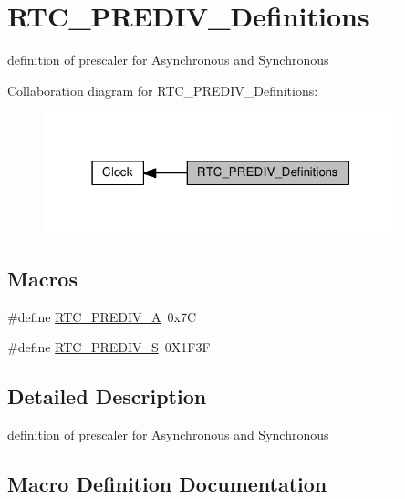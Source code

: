\hypertarget{group___r_t_c___p_r_e_d_i_v___definitions}{}\section{R\+T\+C\+\_\+\+P\+R\+E\+D\+I\+V\+\_\+\+Definitions}
\label{group___r_t_c___p_r_e_d_i_v___definitions}


definition of prescaler for Asynchronous and Synchronous  


Collaboration diagram for R\+T\+C\+\_\+\+P\+R\+E\+D\+I\+V\+\_\+\+Definitions\+:\nopagebreak
\begin{figure}[H]
\begin{center}
\leavevmode
\includegraphics[width=291pt]{d0/dbf/group___r_t_c___p_r_e_d_i_v___definitions}
\end{center}
\end{figure}
\subsection*{Macros}
\begin{DoxyCompactItemize}
\item 
\#define \hyperlink{group___r_t_c___p_r_e_d_i_v___definitions_ga7d28a18fc36cff684ad43ffd31ca45fc}{R\+T\+C\+\_\+\+P\+R\+E\+D\+I\+V\+\_\+A}~0x7C
\item 
\#define \hyperlink{group___r_t_c___p_r_e_d_i_v___definitions_ga3578b56bdfe76014a3af7e276fe6a6e4}{R\+T\+C\+\_\+\+P\+R\+E\+D\+I\+V\+\_\+S}~0\+X1\+F3F
\end{DoxyCompactItemize}


\subsection{Detailed Description}
definition of prescaler for Asynchronous and Synchronous 



\subsection{Macro Definition Documentation}
